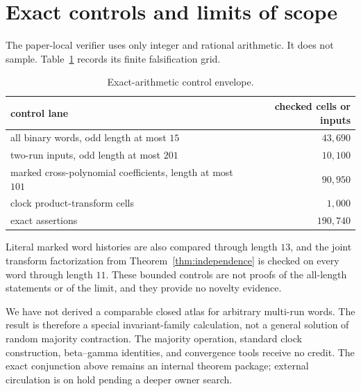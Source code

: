 \documentclass[10pt,a4paper]{amsart}
\theoremstyle{remark}
\newcommand{\1}{\mathbf 1}
\begin{document}
\section{Exact controls and limits of scope}

The paper-local verifier uses only integer and rational arithmetic.  It does
not sample.  Table~\ref{tab:controls} records its finite falsification grid.

\begin{table}[h]
\centering
\caption{Exact-arithmetic control envelope.}\label{tab:controls}
\begin{tabular}{lr}
\toprule
control lane & checked cells or inputs\\
\midrule
all binary words, odd length at most $15$ & $43{,}690$\\
two-run inputs, odd length at most $201$ & $10{,}100$\\
marked cross-polynomial coefficients, length at most $101$ & $90{,}950$\\
clock product-transform cells & $1{,}000$\\
exact assertions & $190{,}740$\\
\bottomrule
\end{tabular}
\end{table}

Literal marked word histories are also compared through length $13$, and the
joint transform factorization from Theorem~\ref{thm:independence} is checked
on every word through length $11$.  These bounded controls are not proofs of
the all-length statements or of the limit, and they provide no novelty
evidence.

We have not derived a comparable closed atlas for arbitrary multi-run words.
The result is therefore a special invariant-family calculation, not a general
solution of random majority contraction.  The majority operation, standard
clock construction, beta--gamma identities, and convergence tools receive no
credit.  The exact conjunction above remains an internal theorem package;
external circulation is on hold pending a deeper owner search.



\end{document}
